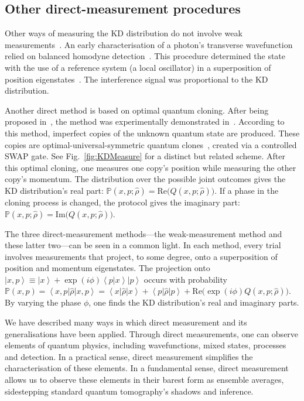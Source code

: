 \documentclass[%
 reprint,
superscriptaddress,
nofootinbib,
bibnotes,
 amsmath,amssymb,
 aps,
]{revtex4-1}
\theoremstyle{plain}
\newcommand{\LParen}{ \bm{(} }
\newcommand{\RParen}{ \bm{)} }
\begin{document}
\subsection{Other direct-measurement procedures}
\label{SubSec:procedure_direct}

Other ways of measuring the KD distribution do not involve weak measurements~\cite{Bollen2010,Hofmann2012a,Buscemi_2014,Thekkadath2017,Lostaglio2023kirkwooddirac,Wagner23}. An early characterisation of a photon's transverse wavefunction relied on balanced homodyne detection~\cite{Bollen2010}. This procedure determined the state with the use of a reference system (a local oscillator) in a superposition of position eigenstates~\cite{Bollen2010}. 
The interference signal was proportional to the KD distribution. 

Another direct method is based on optimal quantum cloning. After being proposed in~\cite{Hofmann2012a}, the method was experimentally demonstrated in~\cite{Thekkadath2017}. According to this method, imperfect copies of the unknown quantum state are produced. These copies are optimal-universal-symmetric quantum clones~\cite{Hofmann2012a}, created via a controlled SWAP gate. See Fig.~\ref{fig:KDMeasure} for a distinct but related scheme. After this optimal cloning, one measures one copy's position while measuring the other copy's momentum.  The distribution over the possible joint outcomes gives the KD distribution's real part: $\mathbb{P}(x,p;\hat{\rho})=\mathrm{Re} \LParen Q(x,p;\hat{\rho}) \RParen$. If a phase in the cloning process is changed, the protocol gives the imaginary part: 
$\mathbb{P}(x,p;\hat{\rho})=\mathrm{Im} \LParen Q(x,p;\hat{\rho}) \RParen$.

The three direct-measurement methods---the weak-measurement method and these latter two---can be seen in a common light. In each method, every trial involves measurements that project, to some degree, onto a superposition of position and momentum eigenstates. The projection onto $\left|x,p\right\rangle \equiv\left|x\right\rangle +\exp(i\phi)\left\langle p|x\right\rangle \left|p\right\rangle $
occurs with probability $\mathbb{P}(x,p)=\left\langle x,p\right|\hat{\rho}\left|x,p\right\rangle =\left\langle x\right|\hat{\rho}\left|x\right\rangle +\left\langle p\right|\hat{\rho}\left|p\right\rangle +\mathrm{Re} \LParen \exp(i\phi)Q(x,p;\hat{\rho}) \RParen$.
By varying the phase $\phi$, one finds the KD distribution's real and imaginary parts.



We have described many ways in which direct measurement and its generalisations have been applied. Through direct measurements, one can observe elements of quantum physics, including wavefunctions, mixed states, processes and detection. In a practical sense, direct measurement simplifies the characterisation of these elements. In a fundamental sense, direct measurement allows us to observe these elements in their barest form as ensemble averages, sidestepping standard quantum tomography's shadows and inference. 
\end{document}
